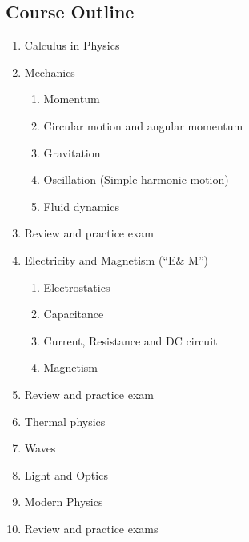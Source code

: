 \documentclass[11pt,letterpaper]{article}
\begin{document}
\subsection*{Course Outline}
\begin{enumerate}[itemsep=.1ex]
\item Calculus in Physics
\item Mechanics
  \begin{enumerate}
  \item Momentum
  \item Circular motion and angular momentum
  \item Gravitation
  \item Oscillation (Simple harmonic motion)
  \item Fluid dynamics
  \end{enumerate}
\item Review and practice exam
\item Electricity and Magnetism (``E\& M'')
  \begin{enumerate}
  \item Electrostatics
  \item Capacitance
  \item Current, Resistance and DC circuit
  \item Magnetism
  \end{enumerate}
\item Review and practice exam
\item Thermal physics
\item Waves
\item Light and Optics
\item Modern Physics
\item Review and practice exams
\end{enumerate}
\end{document}
